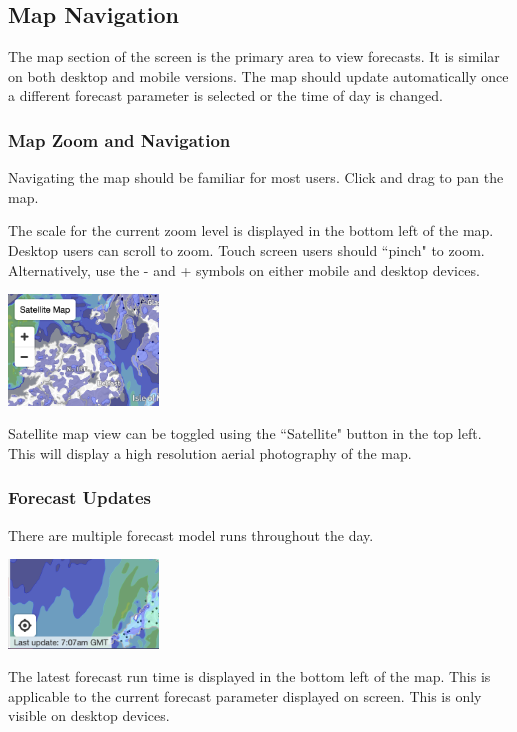 \documentclass[11pt,a4paper]{article}
\begin{document}
\subsection{Map Navigation} \label{subsec:mapnav}
The map section of the screen is the primary area to view forecasts. It is similar on both desktop and mobile versions. The map should update automatically once a different forecast parameter is selected or the time of day is changed.

\subsubsection{Map Zoom and Navigation}
Navigating the map should be familiar for most users. Click and drag to pan the map. 

The scale for the current zoom level is displayed in the bottom left of the map. Desktop users can scroll to zoom. Touch screen users should ``pinch" to zoom. Alternatively, use the - and + symbols on either mobile and desktop devices.
\begin{center}
\includegraphics[width=4cm]{images/map_zoom.png}
\end{center}
Satellite map view can be toggled using the ``Satellite" button in the top left. This will display a high resolution aerial photography of the map.

\subsubsection{Forecast Updates}
There are multiple forecast model runs throughout the day.
\begin{center}
\includegraphics[width=4cm]{images/last_update.png}
\end{center}
The latest forecast run time is displayed in the bottom left of the map. This is applicable to the current forecast parameter displayed on screen. This is only visible on desktop devices.
\end{document}
